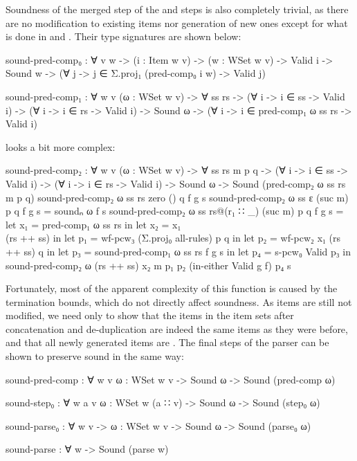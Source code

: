 		Soundness of the merged step  of the 
		and  steps is also completely trivial, as there are no
		modification to existing items nor generation of new ones except for
		what is done in  and . Their type
		signatures are shown below:

		\begin{code}
			sound-pred-comp₀ : ∀ {v w} ->
			  (i : Item w v) ->
			  (w : WSet w v) ->
			  Valid i -> Sound w ->
			  (∀ {j} -> j ∈ Σ.proj₁ (pred-comp₀ i w) -> Valid j)

			sound-pred-comp₁ : ∀ {w v} (ω : WSet w v) -> ∀ ss rs ->
			  (∀ {i} -> i ∈ ss -> Valid i) ->
			  (∀ {i} -> i ∈ rs -> Valid i) ->
			  Sound ω -> (∀ {i} -> i ∈ pred-comp₁ ω ss rs -> Valid i)
		\end{code}

		 looks a bit more complex:

		\begin{code}
			sound-pred-comp₂ : ∀ {w v} (ω : WSet w v) -> ∀ ss rs m p q ->
			  (∀ {i} -> i ∈ ss -> Valid i) ->
			  (∀ {i} -> i ∈ rs -> Valid i) ->
			  Sound ω -> Sound (pred-comp₂ ω ss rs m p q)
			sound-pred-comp₂ ω ss rs zero () q f g s
			sound-pred-comp₂ ω ss ε (suc m) p q f g s = soundₙ ω f s
			sound-pred-comp₂ ω ss rs@(r₁ ∷ _) (suc m) p q f g s =
			  let x₁ = pred-comp₁ ω ss rs in
			  let x₂ = x₁ \\ (rs ++ ss) in
			  let p₁ = wf-pcw₃ (Σ.proj₀ all-rules) p q  in
			  let p₂ = wf-pcw₂ x₁ (rs ++ ss) q in
			  let p₃ = sound-pred-comp₁ ω ss rs f g s in
			  let p₄ = s-pcw₀ Valid p₃ in
			  sound-pred-comp₂ ω (rs ++ ss) x₂ m p₁ p₂ (in-either Valid g f) p₄ s
		\end{code}

		Fortunately, most of the apparent complexity of this function is caused
		by the termination bounds, which do not directly affect soundness. As
		items are still not modified, we need only to show that the items in
		the item sets after concatenation and de-duplication are indeed the
		same items as they were before, and that all newly generated items are
		. The final steps of the parser can be shown to preserve
		sound in the same way:

		\begin{code}
			sound-pred-comp : ∀ {w v} {ω : WSet w v} ->
			  Sound ω -> Sound (pred-comp ω)

			sound-step₀ : ∀ {w a v} {ω : WSet w (a ∷ v)} ->
			  Sound ω -> Sound (step₀ ω)

			sound-parse₀ : ∀ {w v} -> {ω : WSet w v} ->
			  Sound ω -> Sound (parse₀ ω)

			sound-parse : ∀ w -> Sound (parse w)
		\end{code}

